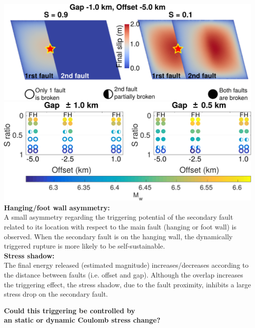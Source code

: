 \begin{poster}
{}








\end{poster}






\vskip -0.15cm
 \includegraphics[width=1\linewidth]{images/ruptures.pdf}
 \vskip 0.1cm
 \includegraphics[width=1\linewidth]{images/results_table} \\
\vskip 0cm
\textbf{\small Hanging/foot wall asymmetry:} \\
\vskip -0.3cm
{\small A small asymmetry regarding the triggering potential of the secondary fault related to its location with respect to the main fault (hanging or foot wall) is observed. When the secondary fault is on the hanging wall, the dynamically triggered rupture is more likely to be self-sustainable.} \\
\vskip 0cm
\textbf{\small Stress shadow:} \\
\vskip -0.3cm
The final energy released (estimated magnitude) increases/decreases according to the distance between faults (i.e. offset and gap). Although the overlap increases the triggering effect, the stress shadow, due to the fault proximity, inhibits a large stress drop on the secondary fault.
\begin{center}
 \textbf{Could this triggering be controlled by \\ an static or dynamic Coulomb stress change?}
\end{center}
